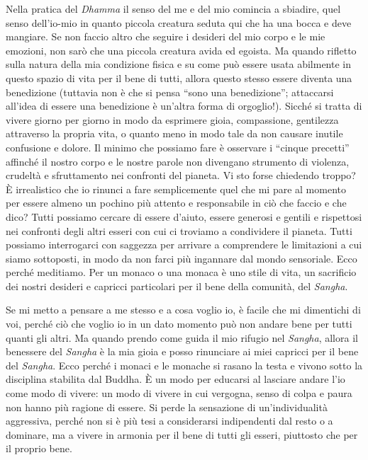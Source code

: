 Nella pratica del \textit{Dhamma} il senso del me e del mio comincia a sbiadire,
quel senso dell'io-mio in quanto piccola creatura seduta qui che ha una
bocca e deve mangiare. Se non faccio altro che seguire i desideri del
mio corpo e le mie emozioni, non sarò che una piccola creatura avida ed
egoista. Ma quando rifletto sulla natura della mia condizione fisica e
su come può essere usata abilmente in questo spazio di vita per il bene
di tutti, allora questo stesso essere diventa una benedizione (tuttavia
non è che si pensa ``sono una benedizione''; attaccarsi all'idea di essere
una benedizione è un'altra forma di orgoglio!). Sicché si tratta di
vivere giorno per giorno in modo da esprimere gioia, compassione,
gentilezza attraverso la propria vita, o quanto meno in modo tale da non
causare inutile confusione e dolore. Il minimo che possiamo fare è
osservare i ``cinque precetti'' affinché il nostro corpo e le
nostre parole non divengano strumento di violenza, crudeltà e
sfruttamento nei confronti del pianeta. Vi sto forse chiedendo troppo?
È irrealistico che io rinunci a fare semplicemente quel che mi pare al
momento per essere almeno un pochino più attento e responsabile in ciò
che faccio e che dico? Tutti possiamo cercare di essere d'aiuto, essere
generosi e gentili e rispettosi nei confronti degli altri esseri con cui
ci troviamo a condividere il pianeta. Tutti possiamo interrogarci con
saggezza per arrivare a comprendere le limitazioni a cui siamo
sottoposti, in modo da non farci più ingannare dal mondo sensoriale.
Ecco perché meditiamo. Per un monaco o una monaca è uno stile di vita,
un sacrificio dei nostri desideri e capricci particolari per il bene
della comunità, del \textit{Sangha}.

Se mi metto a pensare a me stesso e a cosa voglio io, è facile che mi
dimentichi di voi, perché ciò che voglio io in un dato momento può non
andare bene per tutti quanti gli altri. Ma quando prendo come guida il
mio rifugio nel \textit{Sangha}, allora il benessere del \textit{Sangha} è la mia gioia e
posso rinunciare ai miei capricci per il bene del \textit{Sangha}. Ecco perché i
monaci e le monache si rasano la testa e vivono sotto la disciplina
stabilita dal Buddha. È un modo per educarsi al lasciare andare l'io
come modo di vivere: un modo di vivere in cui vergogna, senso di colpa e
paura non hanno più ragione di essere. Si perde la sensazione di
un'individualità aggressiva, perché non si è più tesi a considerarsi
indipendenti dal resto o a dominare, ma a vivere in armonia per il bene
di tutti gli esseri, piuttosto che per il proprio bene.

